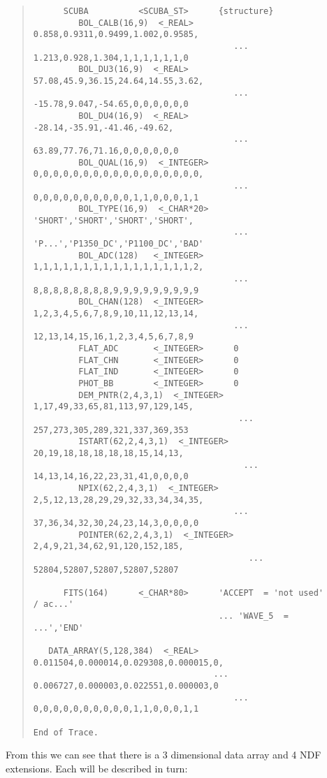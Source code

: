 \documentclass[twoside,11pt]{article}
\newenvironment{myquote}{\begin{quote}\begin{small}}{\end{small}\end{quote}}
\begin{document}
\begin{myquote}
\begin{verbatim}
      SCUBA          <SCUBA_ST>      {structure}
         BOL_CALB(16,9)  <_REAL>        0.858,0.9311,0.9499,1.002,0.9585,
                                        ... 1.213,0.928,1.304,1,1,1,1,1,1,0
         BOL_DU3(16,9)  <_REAL>         57.08,45.9,36.15,24.64,14.55,3.62,
                                        ... -15.78,9.047,-54.65,0,0,0,0,0,0
         BOL_DU4(16,9)  <_REAL>         -28.14,-35.91,-41.46,-49.62,
                                        ... 63.89,77.76,71.16,0,0,0,0,0,0
         BOL_QUAL(16,9)  <_INTEGER>     0,0,0,0,0,0,0,0,0,0,0,0,0,0,0,0,0,
                                        ... 0,0,0,0,0,0,0,0,0,0,1,1,0,0,0,1,1
         BOL_TYPE(16,9)  <_CHAR*20>     'SHORT','SHORT','SHORT','SHORT',
                                        ... 'P...','P1350_DC','P1100_DC','BAD'
         BOL_ADC(128)   <_INTEGER>      1,1,1,1,1,1,1,1,1,1,1,1,1,1,1,1,2,
                                        ... 8,8,8,8,8,8,8,8,9,9,9,9,9,9,9,9,9
         BOL_CHAN(128)  <_INTEGER>      1,2,3,4,5,6,7,8,9,10,11,12,13,14,
                                        ... 12,13,14,15,16,1,2,3,4,5,6,7,8,9
         FLAT_ADC       <_INTEGER>      0
         FLAT_CHN       <_INTEGER>      0
         FLAT_IND       <_INTEGER>      0
         PHOT_BB        <_INTEGER>      0
         DEM_PNTR(2,4,3,1)  <_INTEGER>   1,17,49,33,65,81,113,97,129,145,
                                         ... 257,273,305,289,321,337,369,353
         ISTART(62,2,4,3,1)  <_INTEGER>   20,19,18,18,18,18,18,15,14,13,
                                          ... 14,13,14,16,22,23,31,41,0,0,0,0
         NPIX(62,2,4,3,1)  <_INTEGER>   2,5,12,13,28,29,29,32,33,34,34,35,
                                        ... 37,36,34,32,30,24,23,14,3,0,0,0,0
         POINTER(62,2,4,3,1)  <_INTEGER>   2,4,9,21,34,62,91,120,152,185,
                                           ... 52804,52807,52807,52807,52807
 
      FITS(164)      <_CHAR*80>      'ACCEPT  = 'not used'           / ac...'
                                     ... 'WAVE_5  =                 ...','END'
 
   DATA_ARRAY(5,128,384)  <_REAL>   0.011504,0.000014,0.029308,0.000015,0,
                                    ... 0.006727,0.000003,0.022551,0.000003,0
                                        ... 0,0,0,0,0,0,0,0,0,0,1,1,0,0,0,1,1

End of Trace.
\end{verbatim}
\end{myquote}

From this we can see that there is a 3 dimensional data array and 4 NDF
extensions. Each will be described in turn:
\end{document}
